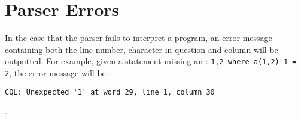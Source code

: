 \section{Parser Errors}
In the case that the parser fails to interpret a program, an error message containing both the line number, character in question and  column will be outputted. For example, given a statement missing an : \lstinline!1,2 where a(1,2) 1 = 2!, the error message will be:
\begin{lstlisting}[style=framed]
CQL: Unexpected '1' at word 29, line 1, column 30
\end{lstlisting}.